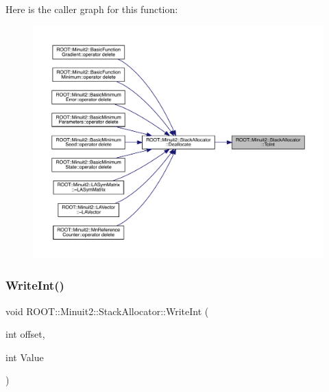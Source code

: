 Here is the caller graph for this function\+:\nopagebreak
\begin{figure}[H]
\begin{center}
\leavevmode
\includegraphics[width=350pt]{d3/d1e/classROOT_1_1Minuit2_1_1StackAllocator_a8c8afb9902a08eec0ec7c863636694e5_icgraph}
\end{center}
\end{figure}
\mbox{\label{classROOT_1_1Minuit2_1_1StackAllocator_a1f87ef34658b74aa3fff9abd1cd1094e}} 
\subsubsection{\texorpdfstring{WriteInt()}{WriteInt()}\hspace{0.1cm}{\footnotesize\ttfamily [1/2]}}
{\footnotesize\ttfamily void R\+O\+O\+T\+::\+Minuit2\+::\+Stack\+Allocator\+::\+Write\+Int (\begin{DoxyParamCaption}\item[{int}]{offset,  }\item[{int}]{Value }\end{DoxyParamCaption})\hspace{0.3cm}{\ttfamily [inline]}}

